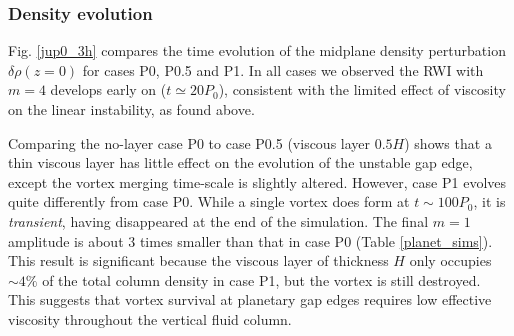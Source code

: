 \subsubsection{Density evolution}%

Fig. \ref{jup0_3h} compares the time evolution of the midplane density
perturbation $\delta\rho(z=0)$ for cases P0, P0.5 and P1. In 
all cases we observed the RWI with $m=4$ develops early on ($t\simeq20P_0$),
consistent with the limited effect of viscosity on the linear
instability, as found above.  

Comparing the no-layer case P0 to case P0.5 (viscous layer $0.5H$)
shows that a thin viscous layer has little effect on the
evolution of the unstable gap edge, except the vortex merging
time-scale is slightly altered. However, case P1 evolves quite
differently from case P0. While a single vortex does form at
$t\sim100P_0$, it is \emph{transient}, having disappeared at the end of
the simulation. The final $m=1$ amplitude is about 3 times smaller
than that in case P0 (Table \ref{planet_sims}). This result is
significant because the viscous layer of 
thickness $H$ only occupies $\sim4\%$ of the total column density
in case P1, but the vortex is still destroyed. This suggests that vortex
survival at planetary gap edges requires low effective viscosity
throughout the vertical fluid column. 

